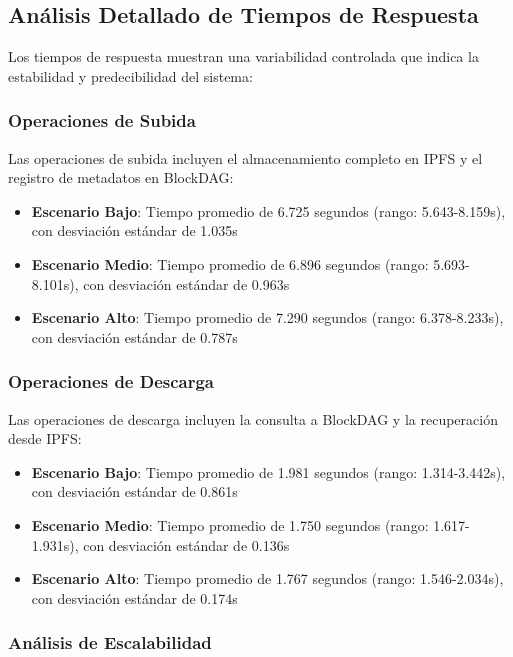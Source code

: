 \documentclass[onecolumn]{article}
\begin{document}
\subsection{Análisis Detallado de Tiempos de Respuesta}

Los tiempos de respuesta muestran una variabilidad controlada que indica la estabilidad y predecibilidad del sistema:

\subsubsection{Operaciones de Subida}

Las operaciones de subida incluyen el almacenamiento completo en IPFS y el registro de metadatos en BlockDAG:

\begin{itemize}
    \item \textbf{Escenario Bajo}: Tiempo promedio de 6.725 segundos (rango: 5.643-8.159s), con desviación estándar de 1.035s
    \item \textbf{Escenario Medio}: Tiempo promedio de 6.896 segundos (rango: 5.693-8.101s), con desviación estándar de 0.963s
    \item \textbf{Escenario Alto}: Tiempo promedio de 7.290 segundos (rango: 6.378-8.233s), con desviación estándar de 0.787s
\end{itemize}

\subsubsection{Operaciones de Descarga}

Las operaciones de descarga incluyen la consulta a BlockDAG y la recuperación desde IPFS:

\begin{itemize}
    \item \textbf{Escenario Bajo}: Tiempo promedio de 1.981 segundos (rango: 1.314-3.442s), con desviación estándar de 0.861s
    \item \textbf{Escenario Medio}: Tiempo promedio de 1.750 segundos (rango: 1.617-1.931s), con desviación estándar de 0.136s
    \item \textbf{Escenario Alto}: Tiempo promedio de 1.767 segundos (rango: 1.546-2.034s), con desviación estándar de 0.174s
\end{itemize}

\subsubsection{Análisis de Escalabilidad}
\end{document}
